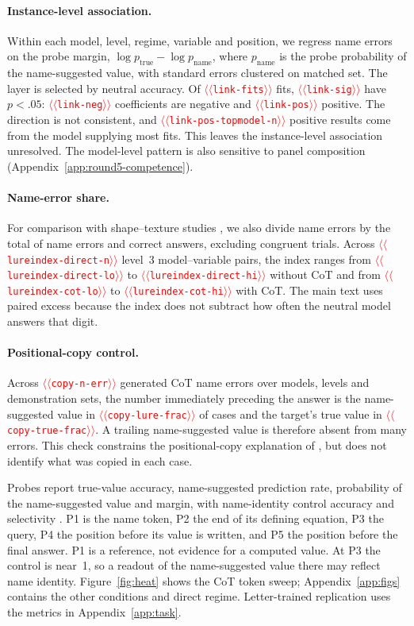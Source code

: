 \documentclass[11pt]{article}
\providecommand{\NUM}[1]{\textcolor{red}{$\langle\langle$\texttt{#1}$\rangle\rangle$}}
\begin{document}
\paragraph{Instance-level association.} Within each model, level, regime, variable and
position, we regress name errors on the probe margin, $\log p_{\mathrm{true}}-\log p_{\mathrm{name}}$,
where $p_{\mathrm{name}}$ is the probe probability of the name-suggested value,
with standard errors clustered on matched set. The layer is selected by neutral accuracy.
Of \NUM{link-fits} fits, \NUM{link-sig} have $p<.05$: \NUM{link-neg} coefficients are negative
and \NUM{link-pos} positive. The direction is not consistent, and \NUM{link-pos-topmodel-n}
positive results come from the model supplying most fits. This leaves the instance-level
association unresolved. The model-level pattern is also sensitive to panel composition
(Appendix~\ref{app:round5-competence}).

\paragraph{Name-error share.} For comparison with shape--texture studies \cite{geirhos2019texture},
we also divide name errors by the total of name errors and correct answers, excluding congruent trials.
Across \NUM{lureindex-direct-n} level~3 model--variable pairs, the index ranges from
\NUM{lureindex-direct-lo} to \NUM{lureindex-direct-hi} without CoT and from
\NUM{lureindex-cot-lo} to \NUM{lureindex-cot-hi} with CoT. The main text uses paired excess
because the index does not subtract how often the neutral model answers that digit.

\paragraph{Positional-copy control.} Across \NUM{copy-n-err} generated CoT name errors over
models, levels and demonstration sets, the number immediately preceding the answer is the
name-suggested value in \NUM{copy-lure-frac} of cases and the target's true value in \NUM{copy-true-frac}.
A trailing name-suggested value is therefore absent from many errors. This check constrains the positional-copy
explanation of \citet{liu2026readout}, but does not identify what was copied in each case.

Probes report true-value accuracy, name-suggested prediction rate, probability of the name-suggested value and margin, with name-identity
control accuracy and selectivity \cite{hewitt2019control}. P1 is the name token, P2 the end of
its defining equation, P3 the query, P4 the position before its value is written, and P5 the
position before the final answer. P1 is a reference, not evidence for a computed value.
At P3 the control is near~1, so a readout of the name-suggested value there may reflect name identity.
Figure~\ref{fig:heat} shows the CoT token sweep; Appendix~\ref{app:figs} contains the other
conditions and direct regime. Letter-trained replication uses the metrics in
Appendix~\ref{app:task}.
\end{document}
